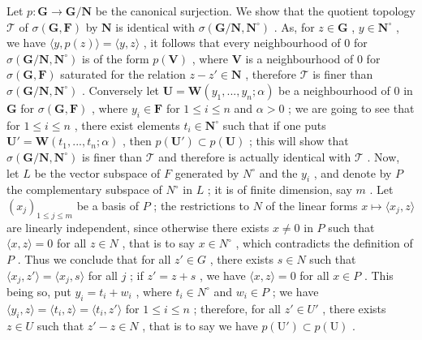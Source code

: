 \begin{enumerate}
  Let \(p: \mathbf{G} \to \mathbf{G} / \mathbf{N}\) be the canonical surjection. We show that the quotient topology \(\mathcal{T}\) of \(\sigma(\mathbf{G}, \mathbf{F})\) by \(\mathbf{N}\) is identical with \(\sigma(\mathbf{G} / \mathbf{N}, \mathbf{N}^{\circ})\) . As, for \(z \in \mathbf{G}\) , \(y \in \mathbf{N}^{\circ}\) , we have \(\langle y, p(z) \rangle = \langle y, z \rangle\) , it follows that every neighbourhood of 0 for \(\sigma(\mathbf{G} / \mathbf{N}, \mathbf{N}^{\circ})\) is of the form \(p(\mathbf{V})\) , where \(\mathbf{V}\) is a neighbourhood of 0 for \(\sigma(\mathbf{G}, \mathbf{F})\) saturated for the relation \(z - z' \in \mathbf{N}\) , therefore \(\mathcal{T}\) is finer than \(\sigma(\mathbf{G} / \mathbf{N}, \mathbf{N}^{\circ})\) . Conversely let \(\mathbf{U} = \mathbf{W}(y_1, ..., y_n; \alpha)\) be a neighbourhood of 0 in \(\mathbf{G}\) for \(\sigma(\mathbf{G}, \mathbf{F})\) , where \(y_i \in \mathbf{F}\) for \(1 \leqslant i \leqslant n\) and \(\alpha > 0\) ; we are going to see that for \(1 \leqslant i \leqslant n\) , there exist elements \(t_i \in \mathbf{N}^{\circ}\) such that if one puts \(\mathbf{U}' = \mathbf{W}(t_1, ..., t_n; \alpha)\) , then \(p(\mathbf{U}') \subset p(\mathbf{U})\) ; this will show that \(\sigma(\mathbf{G} / \mathbf{N}, \mathbf{N}^{\circ})\) is finer than \(\mathcal{T}\) and therefore is actually identical with \(\mathcal{T}\) . Now, let \(L\) be the vector subspace of \(F\) generated by \(N^{\circ}\) and the \(y_i\) , and denote by \(P\) the complementary subspace of \(N^{\circ}\) in \(L\) ; it is of finite dimension, say \(m\) . Let \((x_j)_{1 \leqslant j \leqslant m}\) be a basis of \(P\) ; the restrictions to \(N\) of the linear forms \(x \mapsto \langle x_j, z \rangle\) are linearly independent, since otherwise there exists \(x \neq 0\) in \(P\) such that \(\langle x, z \rangle = 0\) for all \(z \in N\) , that is to say \(x \in N^{\circ}\) , which contradicts the definition of \(P\) . Thus we conclude that for all \(z' \in G\) , there exists \(s \in N\) such that \(\langle x_j, z' \rangle = \langle x_j, s \rangle\) for all \(j\) ; if \(z' = z + s\) , we have \(\langle x, z \rangle = 0\) for all \(x \in P\) . This being so, put \(y_i = t_i + w_i\) , where \(t_i \in N^{\circ}\) and \(w_i \in P\) ; we have \(\langle y_i, z \rangle = \langle t_i, z \rangle = \langle t_i, z' \rangle\) for \(1 \leqslant i \leqslant n\) ; therefore, for all \(z' \in U'\) , there exists \(z \in U\) such that \(z' - z \in N\) , that is to say we have \(p(\mathrm{U}') \subset p(\mathrm{U})\) .
\end{enumerate}

